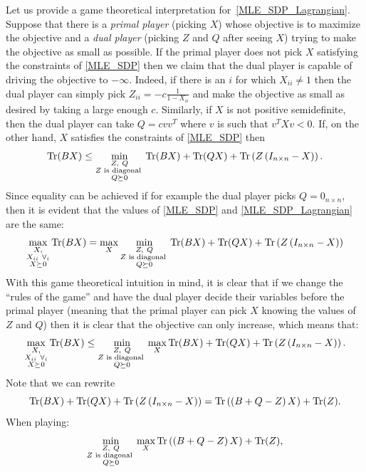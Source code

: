 Let us provide a game theoretical interpretation for~\eqref{MLE_SDP_Lagrangian}. Suppose that there is a {\em primal player} (picking $X$) whose objective is to maximize the objective and a {\em dual player} (picking $Z$ and $Q$ after seeing $X$) trying to make the objective as small as possible. If the primal player does not pick $X$ satisfying the constraints of \eqref{MLE_SDP} then we claim that the dual player is capable of driving the objective to $-\infty$. Indeed, if there is an $i$ for which $X_{ii} \neq 1$ then the dual player can simply pick $Z_{ii} = -c\frac1{1-X_{ii}}$ and make the objective as small as desired by taking a large enough $c$. Similarly, if $X$ is not positive semidefinite, then the dual player can take $Q=c vv^T$ where $v$ is such that $v^TXv <0$. If, on the other hand, $X$ satisfies the constraints of \eqref{MLE_SDP} then
\[
 \operatorname{Tr}(BX) \leq \min_{\substack{Z,\ Q \\ Z \text{ is diagonal } \\ Q\succeq 0}} \operatorname{Tr}(BX) + \operatorname{Tr}(QX) + \operatorname{Tr}\left(Z\left(I_{n\times n}-X\right)\right).
\]
Since equality can be achieved if for example the dual player picks $Q = 0_{n\times n}$, then it is evident that the values of \eqref{MLE_SDP} and \eqref{MLE_SDP_Lagrangian} are the same:
\[
 \max_{\substack{X,\\ X_{ii}\ \forall_i \\ X\succeq 0}} \tr(BX) = \max_{X} \min_{\substack{Z,\ Q \\ Z \text{ is diagonal } \\ Q\succeq 0}} \tr(BX) + \tr(QX) + \tr\left(Z\left(I_{n\times n}-X\right)\right)
\]
With this game theoretical intuition in mind, it is clear that if we change the ``rules of the game'' and have the dual player decide their variables before the primal player (meaning that the primal player can pick $X$ knowing the values of $Z$ and $Q$) then it is clear that the objective can only increase, which means that:
\[
 \max_{\substack{X,\\ X_{ii}\ \forall_i \\ X\succeq 0}} \operatorname{Tr}(BX) \leq \min_{\substack{Z,\ Q \\ Z \text{ is diagonal } \\ Q\succeq 0}} \max_{X}  \operatorname{Tr}(BX) + \operatorname{Tr}(QX) + \operatorname{Tr}\left(Z\left(I_{n\times n}-X\right)\right).
\]
Note that we can rewrite
\[
  \operatorname{Tr}(BX) + \operatorname{Tr}(QX) + \operatorname{Tr}\left(Z\left(I_{n\times n}-X\right)\right) = \operatorname{Tr}\left(\left( B + Q - Z \right)X\right) + \operatorname{Tr}(Z).
\]
When playing:
\[
  \min_{\substack{Z,\ Q \\ Z \text{ is diagonal } \\ Q\succeq 0}} \max_{X}  \operatorname{Tr}\left(\left( B + Q - Z \right)X\right) + \operatorname{Tr}(Z),
\]
